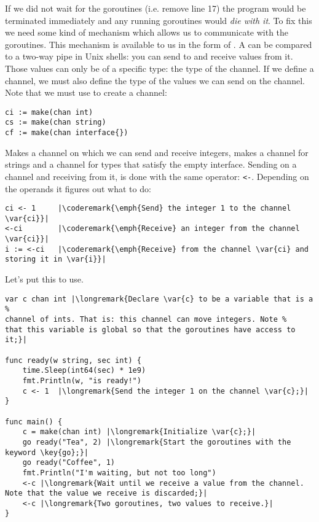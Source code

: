 If we did not wait for the goroutines (i.e. remove line 17) the program
would be terminated immediately and any running goroutines would
\emph{die with it}. 
To fix this we need some kind of mechanism which allows us to
communicate with the goroutines. This mechanism is available
to us in the form of . A
 can be
compared to a two-way pipe in Unix shells: you can send to and receive
values from it. Those values can only be of a specific type: the
type of the channel. If we define a channel, we must also define the
type of the values we can send on the channel. Note that we must use
 to create a channel:
\begin{lstlisting}
ci := make(chan int)
cs := make(chan string)
cf := make(chan interface{})
\end{lstlisting}
Makes  a channel on which we can send and receive integers,
makes  a channel for strings and  a channel for types
that satisfy the empty interface. 
Sending on a channel and receiving from it, is done with the same operator:
\lstinline{<-}. 
Depending on the operands it figures out what to do:
\begin{lstlisting}
ci <- 1	    |\coderemark{\emph{Send} the integer 1 to the channel \var{ci}}|
<-ci	    |\coderemark{\emph{Receive} an integer from the channel \var{ci}}|
i := <-ci   |\coderemark{\emph{Receive} from the channel \var{ci} and storing it in \var{i}}|
\end{lstlisting}
Let's put this to use.
\begin{lstlisting}[numbers=none,caption=Go routines and a channel,label=src:sleeping with channels]
var c chan int |\longremark{Declare \var{c} to be a variable that is a %
channel of ints. That is: this channel can move integers. Note %
that this variable is global so that the goroutines have access to it;}|

func ready(w string, sec int) {
	time.Sleep(int64(sec) * 1e9)
	fmt.Println(w, "is ready!")
	c <- 1	|\longremark{Send the integer 1 on the channel \var{c};}|
}

func main() {
	c = make(chan int) |\longremark{Initialize \var{c};}|
	go ready("Tea", 2) |\longremark{Start the goroutines with the keyword \key{go};}|
	go ready("Coffee", 1)
	fmt.Println("I'm waiting, but not too long")
	<-c |\longremark{Wait until we receive a value from the channel. Note that the value we receive is discarded;}|
	<-c |\longremark{Two goroutines, two values to receive.}|
}
\end{lstlisting}

